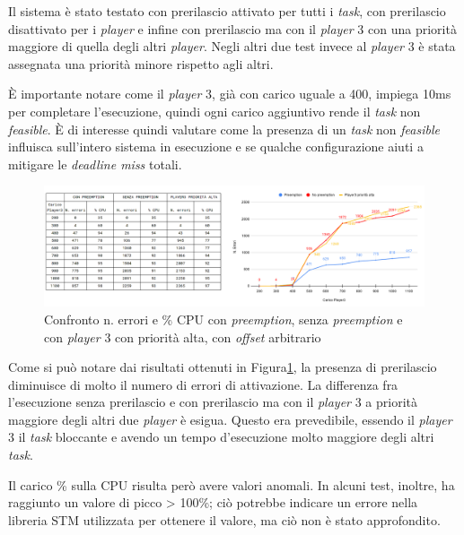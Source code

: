 \documentclass{article}
\begin{document}
Il sistema è stato testato con prerilascio attivato per tutti i \textit{task}, con prerilascio disattivato per i \textit{player} e infine con prerilascio ma con il \textit{player} 3 con una priorità maggiore di quella degli altri \textit{player}. Negli altri due test invece al \textit{player} 3 è stata assegnata una priorità minore rispetto agli altri.

È importante notare come il \textit{player} 3, già con carico uguale a 400, impiega 10ms per completare l'esecuzione, quindi ogni carico aggiuntivo rende il \textit{task} non \textit{feasible}. È di interesse quindi valutare come la presenza di un \textit{task} non \textit{feasible} influisca sull'intero sistema in esecuzione e se qualche configurazione aiuti a mitigare le \textit{deadline miss} totali.
\begin{figure}[H]
	\centering
	\includegraphics[width=7in]{image/CARICO-OFFSET.png}
	\caption{Confronto n. errori e \% CPU con \textit{preemption}, senza \textit{preemption} e con \textit{player} 3 con priorità alta, con \textit{offset} arbitrario}
	\label{siC-siO}
\end{figure}
Come si può notare dai risultati ottenuti in Figura\ref{siC-siO}, la presenza di prerilascio diminuisce di molto il numero di errori di attivazione. La differenza fra l'esecuzione senza prerilascio e con prerilascio ma con il \textit{player} 3 a priorità maggiore degli altri due \textit{player} è esigua. Questo era prevedibile, essendo il \textit{player} 3 il \textit{task} bloccante e avendo un tempo d'esecuzione molto maggiore degli altri \textit{task}. 

Il carico \% sulla CPU risulta però avere valori anomali. In alcuni test, inoltre, ha raggiunto un valore di picco > 100\%; ciò potrebbe indicare un errore nella libreria STM utilizzata per ottenere il valore, ma ciò non è stato approfondito.
\end{document}
